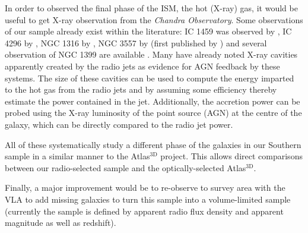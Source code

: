 	In order to observed the final phase of the ISM, the hot (X-ray) gas, it would be useful to get X-ray observation from the \textit{Chandra Observatory}. Some observations of our sample already exist within the literature: IC 1459 was observed by \citet{Fabbiano2003}, IC 4296 by \citet{Pellegrini2002}, NGC 1316 by \citet{Lanz2010}, NGC 3557 by \citet{Ponman2001} (first published by \citealt{Balmaverde2005}) and several observation of NGC 1399 are available \citep[e.g.][]{Su2017}. Many have already noted X-ray cavities apparently created by the radio jets as evidence for AGN feedback by these systems. The size of these cavities can be used to compute the energy imparted to the hot gas from the radio jets and by assuming some efficiency thereby estimate the power contained in the jet. Additionally, the accretion power can be probed using the X-ray luminosity of the point source (AGN) at the centre of the galaxy, which can be directly compared to the radio jet power.

	All of these systematically study a different phase of the galaxies in our Southern sample in a similar manner to the Atlas$^\text{3D}$ project. This allows direct comparisons between our radio-selected sample and the optically-selected Atlas$^\text{3D}$. 

	Finally, a major improvement would be to re-observe to survey area with the VLA to add missing galaxies to turn this sample into a volume-limited sample (currently the sample is defined by apparent radio flux density and apparent magnitude as well as redshift).
